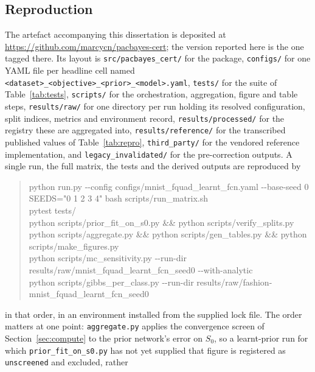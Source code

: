 \begin{uomappendix}
    \section{Reproduction}\label{app:repro}
    The artefact accompanying this dissertation is deposited at \url{https://github.com/marcycn/pacbayes-cert};
    the version reported here is the one tagged there. Its layout is
    \texttt{src/pacbayes\_cert/} for the package, \texttt{configs/} for one YAML
    file per headline cell named
    \texttt{<dataset>\_\allowbreak <objective>\_\allowbreak <prior>\_\allowbreak <model>.yaml},
    \texttt{tests/} for the suite of Table~\ref{tab:tests}, \texttt{scripts/} for
    the orchestration, aggregation, figure and table steps, \texttt{results/raw/}
    for one directory per run holding its resolved configuration, split indices,
    metrics and environment record, \texttt{results/processed/} for the registry
    these are aggregated into, \texttt{results/reference/} for the transcribed
    published values of Table~\ref{tab:repro}, \texttt{third\_party/} for the
    vendored reference implementation, and \texttt{legacy\_invalidated/} for the
    pre-correction outputs. A single run, the full matrix, the tests and the
    derived outputs are reproduced by
    \begin{quote}\footnotesize\ttfamily
    python run.py -{}-config configs/mnist\_fquad\_learnt\_fcn.yaml -{}-base-seed 0\\
    SEEDS="0 1 2 3 4" bash scripts/run\_matrix.sh\\
    pytest tests/\\
    python scripts/prior\_fit\_on\_s0.py \&\& python scripts/verify\_splits.py\\
    python scripts/aggregate.py \&\& python scripts/gen\_tables.py \&\& python scripts/make\_figures.py\\
    python scripts/mc\_sensitivity.py -{}-run-dir results/raw/mnist\_fquad\_learnt\_fcn\_seed0 -{}-with-analytic\\
    python scripts/gibbs\_per\_class.py -{}-run-dir results/raw/fashion-mnist\_fquad\_learnt\_fcn\_seed0
    \end{quote}
    in that order, in an environment installed from the supplied lock file. The
    order matters at one point: \texttt{aggregate.py} applies the convergence
    screen of Section~\ref{sec:compute} to the prior network's error on $S_0$, so
    a learnt-prior run for which \texttt{prior\_fit\_on\_s0.py} has not yet
    supplied that figure is registered as \texttt{unscreened} and excluded, rather

\end{uomappendix}
